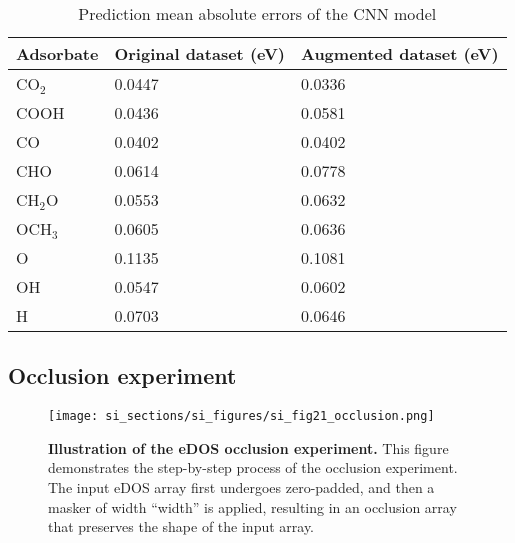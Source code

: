 \begin{table}[h]
  \centering
  \begin{tabular}{lll}
    \hline
    \textbf{Adsorbate} & \textbf{Original dataset (eV)} & \textbf{Augmented dataset (eV)} \\
    \hline
    CO$_2$  & 0.0447 & 0.0336 \\
    COOH    & 0.0436 & 0.0581 \\
    CO      & 0.0402 & 0.0402 \\
    CHO     & 0.0614 & 0.0778 \\
    CH$_2$O & 0.0553 & 0.0632 \\
    OCH$_3$ & 0.0605 & 0.0636 \\
    O       & 0.1135 & 0.1081 \\
    OH      & 0.0547 & 0.0602 \\
    H       & 0.0703 & 0.0646 \\
    \hline
  \end{tabular}
  \caption{Prediction mean absolute errors of the CNN model}
  \label{si_table18:cnn_mae}
\end{table}


\subsection{Occlusion experiment}


\begin{figure}
  \centering
  \texttt{[image: si\_sections/si\_figures/si\_fig21\_occlusion.png]}
  \caption{\textbf{Illustration of the eDOS occlusion experiment.}
  This figure demonstrates the step-by-step process of the occlusion experiment.
  The input eDOS array first undergoes zero-padded, and then a masker of width “width” is applied,
  resulting in an occlusion array that preserves the shape of the input array.}
  \label{si_fig21:occlusion}
\end{figure}


